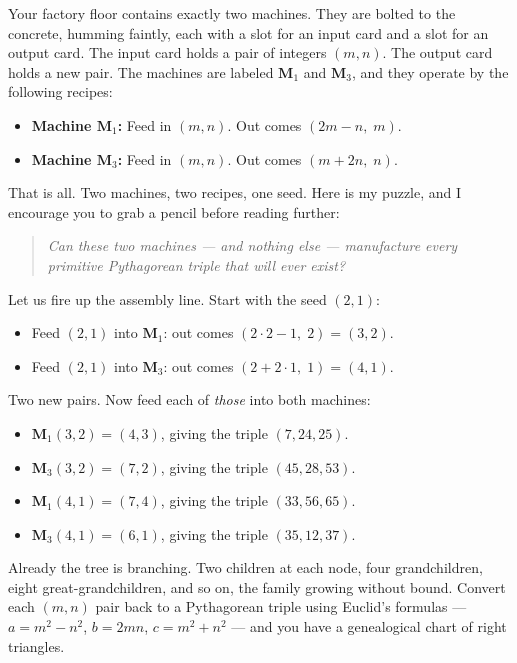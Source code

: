 \documentclass[11pt,twoside,openright]{book}
\theoremstyle{definition}
\theoremstyle{remark}
\begin{document}
Your factory floor contains exactly two machines. They are bolted to the concrete, humming faintly, each with a slot for an input card and a slot for an output card. The input card holds a pair of integers $(m, n)$. The output card holds a new pair. The machines are labeled $\mathbf{M}_1$ and $\mathbf{M}_3$, and they operate by the following recipes:

\begin{itemize}
  \item \textbf{Machine $\mathbf{M}_1$:} Feed in $(m, n)$. Out comes $(2m - n,\; m)$.
  \item \textbf{Machine $\mathbf{M}_3$:} Feed in $(m, n)$. Out comes $(m + 2n,\; n)$.
\end{itemize}

That is all. Two machines, two recipes, one seed. Here is my puzzle, and I encourage you to grab a pencil before reading further:

\begin{quote}
\textit{Can these two machines --- and nothing else --- manufacture every primitive Pythagorean triple that will ever exist?}
\end{quote}
Let us fire up the assembly line. Start with the seed $(2, 1)$:

\begin{itemize}
  \item Feed $(2, 1)$ into $\mathbf{M}_1$: out comes $(2 \cdot 2 - 1,\; 2) = (3, 2)$.
  \item Feed $(2, 1)$ into $\mathbf{M}_3$: out comes $(2 + 2 \cdot 1,\; 1) = (4, 1)$.
\end{itemize}

Two new pairs. Now feed each of \textit{those} into both machines:

\begin{itemize}
  \item $\mathbf{M}_1(3, 2) = (4, 3)$, giving the triple $(7, 24, 25)$.
  \item $\mathbf{M}_3(3, 2) = (7, 2)$, giving the triple $(45, 28, 53)$.
  \item $\mathbf{M}_1(4, 1) = (7, 4)$, giving the triple $(33, 56, 65)$.
  \item $\mathbf{M}_3(4, 1) = (6, 1)$, giving the triple $(35, 12, 37)$.
\end{itemize}

Already the tree is branching. Two children at each node, four grandchildren, eight great-grandchildren, and so on, the family growing without bound. Convert each $(m, n)$ pair back to a Pythagorean triple using Euclid's formulas --- $a = m^2 - n^2$, $b = 2mn$, $c = m^2 + n^2$ --- and you have a genealogical chart of right triangles.
\end{document}
